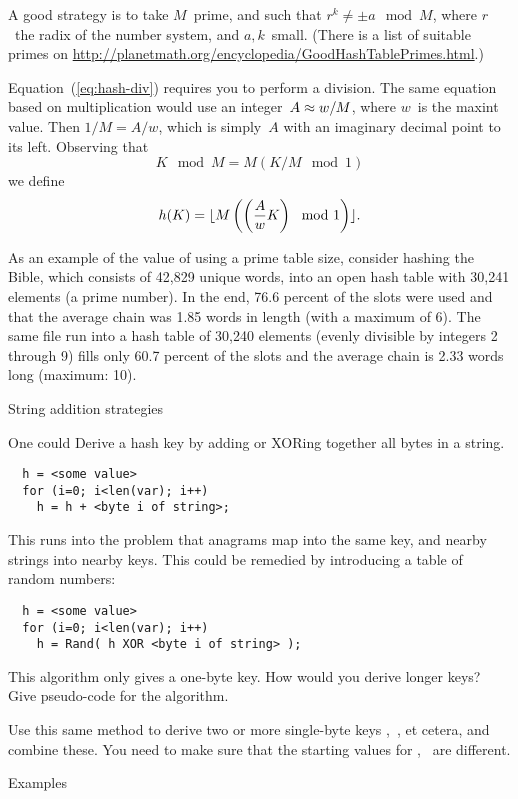 A good strategy is to take $M$~prime, and such that $r^k\not=\pm a\mod
M$, where $r$~the radix of the number system, and $a,k$~small.
(There is a list of suitable primes on
\url{http://planetmath.org/encyclopedia/GoodHashTablePrimes.html}.)

Equation~(\ref{eq:hash-div}) requires you to perform a division. The
same equation based on multiplication would use an integer~$A\approx\nobreak
w/M$, where $w$~is the maxint value. Then $1/M=A/w$, which is
simply~$A$ with an imaginary decimal point to its left. Observing that
\[ K\mod M=M(K/M\mod 1) \]
we define
\[ h(K)=\lfloor M\left(\left({A\over w}K\right)\mod
1\right)\rfloor. \]

As an example of the value of using a prime table size, consider
hashing the Bible, which consists of 42,829 unique words,
into an open hash table
with 30,241 elements (a prime number). In the end, 76.6 percent of the
slots were used and that the average chain was 1.85 words in length
(with a maximum of 6). The same file run into a hash table of 30,240
elements (evenly divisible by integers 2 through 9) fills only 60.7
percent of the slots and the average chain is 2.33 words long
(maximum: 10).

 {String addition strategies}

One could Derive a hash key by adding or XORing together all bytes in
a string.
\begin{verbatim}
  h = <some value>
  for (i=0; i<len(var); i++)
    h = h + <byte i of string>;
\end{verbatim}
This runs into the problem that anagrams map into the same
key, and nearby strings into nearby keys. This could be remedied by
introducing a table of random numbers:
\begin{verbatim}
  h = <some value>
  for (i=0; i<len(var); i++)
    h = Rand( h XOR <byte i of string> );
\end{verbatim}
\begin{594exercise}
This algorithm only gives a one-byte key. How would you
derive longer keys? Give pseudo-code for the algorithm.
\end{594exercise}
\begin{answer}
Use this same method to derive two or more single-byte keys
,~, et cetera, and combine these. You need to make sure that the
starting values for ,~ are different.
\end{answer}

 {Examples}

